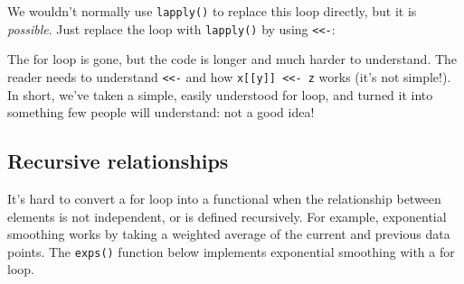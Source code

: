 \begin{Shaded}
\begin{Highlighting}[]
\StringTok{ }\NormalTok{(}
   \StringTok{ }\NormalTok{,}
    \NormalTok{(}\NormalTok{, }\NormalTok{))}
\NormalTok{)}
  \StringTok{ }
\NormalTok{\}}
\end{Highlighting}
\end{Shaded}

We wouldn't normally use \texttt{lapply()} to replace this loop
directly, but it is \emph{possible}. Just replace the loop with
\texttt{lapply()} by using \texttt{\textless{}\textless{}-}:
\indexc{<<-}

\begin{Shaded}
\begin{Highlighting}[]
\NormalTok{(}
  \StringTok{ }
\NormalTok{\})}
\end{Highlighting}
\end{Shaded}

The for loop is gone, but the code is longer and much harder to
understand. The reader needs to understand
\texttt{\textless{}\textless{}-} and how
\texttt{x{[}{[}y{]}{]} \textless{}\textless{}- z} works (it's not
simple!). In short, we've taken a simple, easily understood for loop,
and turned it into something few people will understand: not a good
idea!

\subsection{Recursive relationships}

It's hard to convert a for loop into a functional when the relationship
between elements is not independent, or is defined recursively. For
example, exponential smoothing works by taking a weighted average of the
current and previous data points. The \texttt{exps()} function below
implements exponential smoothing with a for loop.


